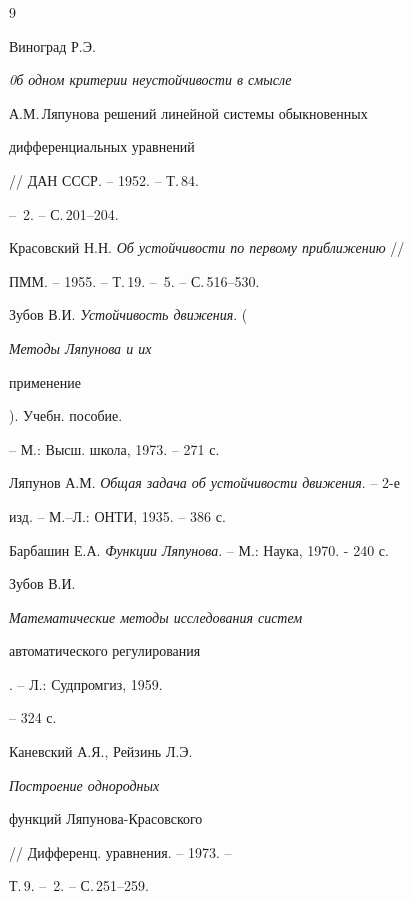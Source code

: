  


\begin{thebibliography}{9} 


 




Виноград Р.Э. {\em 0б одном критерии неустойчивости в смысле 


А.М.\,Ляпунова решений линейной системы обыкновенных 


дифференциальных уравнений} // ДАН СССР. -- 1952. -- Т.\,84. 


-- \No\,2. -- С.\,201--204. 




Красовский Н.Н. {\em Об устойчивости по первому приближению} // 


ПММ. -- 1955. -- Т.\,19. -- \No\,5. -- С.\,516--530. 




Зубов В.И. {\em Устойчивость движения}. ({\em Методы Ляпунова и их 


применение}). Учебн. пособие. 


-- М.: Высш. школа, 1973. -- 271 с. 




Ляпунов А.М. {\em Общая задача об устойчивости движения}. -- 2-е 


изд. -- М.--Л.: ОНТИ, 1935. -- 386 с. 




Барбашин Е.А. {\em Функции Ляпунова}. -- М.: Наука, 1970. - 240 с. 




Зубов В.И. {\em Математические методы исследования систем 


автоматического регулирования}. -- Л.: Судпромгиз, 1959. 


-- 324 с. 




Каневский А.Я., Рейзинь Л.Э. {\em Построение однородных 


функций Ляпунова-Красовского} // Дифференц. уравнения. -- 1973. -- 


Т.\,9. -- \No\,2. -- С.\,251--259. 


 


 


 


 


\end{thebibliography} 


 


\vskip 2cm 


 






 





